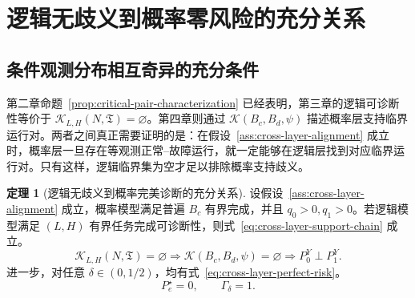 \documentclass[master,fontset=ubuntu]{shnuthesis}
\theoremstyle{definition}
\newtheorem{thesistheorem}{定理}
\begin{document}
\section{逻辑无歧义到概率零风险的充分关系}

\subsection{条件观测分布相互奇异的充分条件}

第二章命题~\ref{prop:critical-pair-characterization} 已经表明，第三章的逻辑可诊断性等价于 \(\mathcal K_{L,H}(N,\mathfrak T)=\varnothing\)。第四章则通过 \(\mathcal K(B_c,B_d,\psi)\) 描述概率层支持临界运行对。两者之间真正需要证明的是：在假设~\ref{ass:cross-layer-alignment} 成立时，概率层一旦存在等观测正常--故障运行，就一定能够在逻辑层找到对应临界运行对。只有这样，逻辑临界集为空才足以排除概率支持歧义。

\begin{thesistheorem}[逻辑无歧义到概率完美诊断的充分关系]
\label{thm:logical-to-perfect-probability}
设假设~\ref{ass:cross-layer-alignment} 成立，概率模型满足普遍 \(B_c\) 有界完成，并且 \(q_0>0,q_1>0\)。若逻辑模型满足 \((L,H)\) 有界任务完成可诊断性，则式~\eqref{eq:cross-layer-support-chain} 成立。
\begin{equation}
\mathcal K_{L,H}(N,\mathfrak T)=\varnothing
\Longrightarrow
\mathcal K(B_c,B_d,\psi)=\varnothing
\Longrightarrow
P_0^Y\perp P_1^Y.
\label{eq:cross-layer-support-chain}
\end{equation}
进一步，对任意 \(\delta\in(0,1/2)\)，均有式~\eqref{eq:cross-layer-perfect-risk}。
\begin{equation}
P_e^\star=0,
\qquad
\Gamma_\delta=1.
\label{eq:cross-layer-perfect-risk}
\end{equation}
\end{thesistheorem}
\end{document}
